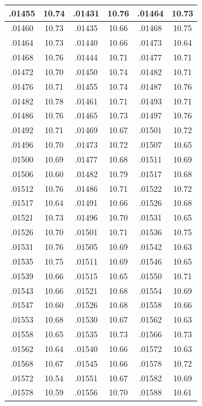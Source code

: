 \documentclass[10pt,twoside]{report}
\begin{document}
\begin{appendices}
\begin{longtable}{|c|c||c|c||c|c|}
.01455 & 10.74 & .01431 & 10.76 & .01464 & 10.73\\\hline
.01460 & 10.73 & .01435 & 10.66 & .01468 & 10.75\\\hline
.01464 & 10.73 & .01440 & 10.66 & .01473 & 10.64\\\hline
.01468 & 10.76 & .01444 & 10.71 & .01477 & 10.71\\\hline
.01472 & 10.70 & .01450 & 10.74 & .01482 & 10.71\\\hline
.01476 & 10.71 & .01455 & 10.74 & .01487 & 10.76\\\hline
.01482 & 10.78 & .01461 & 10.71 & .01493 & 10.71\\\hline
.01486 & 10.76 & .01465 & 10.73 & .01497 & 10.76\\\hline
.01492 & 10.71 & .01469 & 10.67 & .01501 & 10.72\\\hline
.01496 & 10.70 & .01473 & 10.72 & .01507 & 10.65\\\hline
.01500 & 10.69 & .01477 & 10.68 & .01511 & 10.69\\\hline
.01506 & 10.60 & .01482 & 10.79 & .01517 & 10.68\\\hline
.01512 & 10.76 & .01486 & 10.71 & .01522 & 10.72\\\hline
.01517 & 10.64 & .01491 & 10.66 & .01526 & 10.68\\\hline
.01521 & 10.73 & .01496 & 10.70 & .01531 & 10.65\\\hline
.01526 & 10.70 & .01501 & 10.71 & .01536 & 10.75\\\hline
.01531 & 10.76 & .01505 & 10.69 & .01542 & 10.63\\\hline
.01535 & 10.75 & .01511 & 10.69 & .01546 & 10.65\\\hline
.01539 & 10.66 & .01515 & 10.65 & .01550 & 10.71\\\hline
.01543 & 10.66 & .01521 & 10.68 & .01554 & 10.69\\\hline
.01547 & 10.60 & .01526 & 10.68 & .01558 & 10.66\\\hline
.01553 & 10.68 & .01530 & 10.67 & .01562 & 10.63\\\hline
.01558 & 10.65 & .01535 & 10.73 & .01566 & 10.73\\\hline
.01562 & 10.64 & .01540 & 10.66 & .01572 & 10.63\\\hline
.01568 & 10.67 & .01545 & 10.66 & .01578 & 10.72\\\hline
.01572 & 10.54 & .01551 & 10.67 & .01582 & 10.69\\\hline
.01578 & 10.59 & .01556 & 10.70 & .01588 & 10.61\\\hline

\end{longtable}
\end{appendices}
\end{document}
